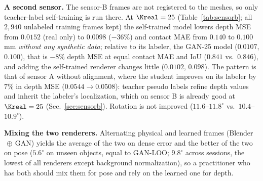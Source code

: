 \noindent\textbf{A second sensor.} The sensor-B frames are not registered to the meshes, so only teacher-label self-training is run there. At $\Kreal=25$ (Table~\ref{tab:sensorb}; all $2{,}940$ unlabeled training frames kept) the self-trained model lowers depth MSE from $0.0152$ (real only) to $0.0098$ ($-36\%$) and contact MAE from $0.140$ to $0.100\,$mm \emph{without any synthetic data}; relative to its labeler, the GAN-25 model ($0.0107$, $0.100$), that is $-8\%$ depth MSE at equal contact MAE and IoU ($0.841$ vs.\ $0.846$), and adding the self-trained renderer changes little ($0.0102$, $0.098$). The pattern is that of sensor A without alignment, where the student improves on its labeler by $7\%$ in depth MSE ($0.0544\!\to\!0.0508$): teacher pseudo labels refine depth values and inherit the labeler's localization, which on sensor B is already good at $\Kreal=25$ (Sec.~\ref{sec:sensorb}). Rotation is not improved ($11.6$--$11.8^\circ$ vs.\ $10.4$--$10.9^\circ$).

\noindent\textbf{Mixing the two renderers.} Alternating physical and learned frames (Blender$\,\oplus\,$GAN) yields the average of the two on dense error and the better of the two on pose ($5.6^\circ$ on unseen objects, equal to GAN-LOO; $9.8^\circ$ across sessions, the lowest of all renderers except background normalization), so a practitioner who has both should mix them for pose and rely on the learned one for depth.
